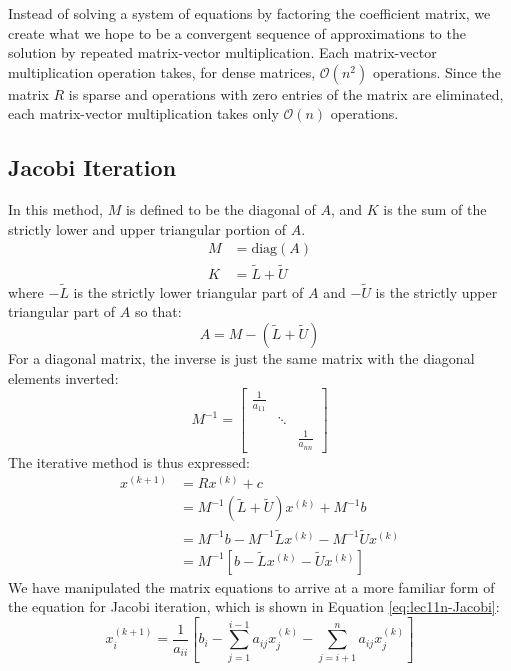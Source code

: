 Instead of solving a system of equations by factoring the coefficient matrix, we create what we hope to be a convergent sequence of approximations to the solution by repeated matrix-vector multiplication.  Each matrix-vector multiplication operation takes, for dense matrices, $\mathcal{O}(n^2)$ operations.  Since the matrix $R$ is sparse and operations with zero entries of the matrix are eliminated, each matrix-vector multiplication takes only $\mathcal{O}(n)$ operations.

\subsection{Jacobi Iteration}

In this method, $M$ is defined to be the diagonal of $A$, and $K$ is the sum of the strictly lower and upper triangular portion of $A$.\cite{demmel1997applied}
\begin{align}
M &= \text{diag}(A) \\
K &= \tilde{L} + \tilde{U}
\end{align}
where $-\tilde{L}$ is the strictly lower triangular part of $A$ and $-\tilde{U}$ is the strictly upper triangular part of $A$ so that:
\begin{equation*}
A = M - (\tilde{L} + \tilde{U})
\end{equation*}
For a diagonal matrix, the inverse is just the same matrix with the diagonal elements inverted:
\begin{equation*}
M^{-1} = \left[
\begin{matrix}
\frac{1}{a_{11}} & &  \\
 & \ddots & \\
 & & \frac{1}{a_{nn}} 
 \end{matrix}
\right]
\end{equation*}
The iterative method is thus expressed:
\begin{align*}
x^{(k+1)} &= Rx^{(k)} + c \\
&=M^{-1}(\tilde{L} + \tilde{U})x^{(k)} + M^{-1}b \\
&=M^{-1}b - M^{-1}\tilde{L}x^{(k)} - M^{-1}\tilde{U}x^{(k)} \\
&=M^{-1}\left[b - \tilde{L}x^{(k)} - \tilde{U}x^{(k)}\right]
\end{align*}
We have manipulated the matrix equations to arrive at a more familiar form of the equation for Jacobi iteration, which is shown in Equation \ref{eq:lec11n-Jacobi}:
\begin{equation}
x_i^{(k+1)} = \frac{1}{a_{ii}}\left[b_{i} - \sum\limits_{j=1}^{i-1}a_{ij}x_{j}^{(k)} - \sum\limits_{j=i+1}^{n}a_{ij}x_j^{(k)} \right]
\label{eq:lec11n-Jacobi}
\end{equation}
